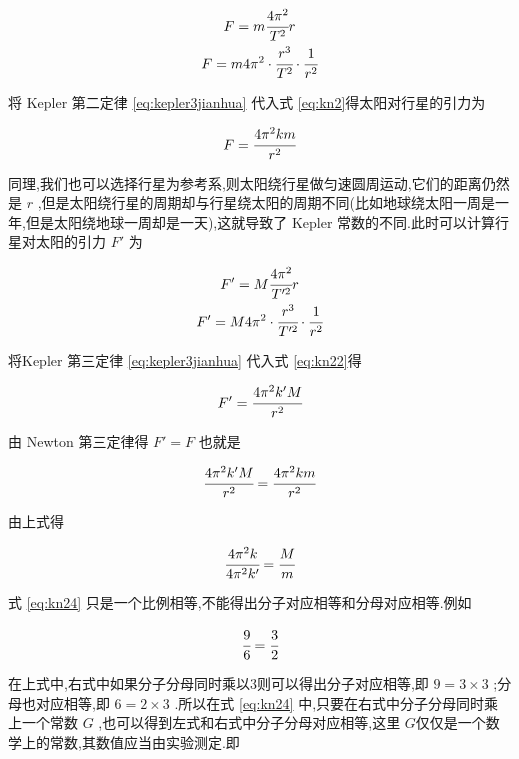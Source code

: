 \begin{gather}
  F=m\cfrac{4\pi^2}{T^2}r \notag\\
  F=m4\pi^2 \cdot \cfrac{r^3}{T^2} \cdot \cfrac{1}{r^2} 
  \label{eq:kn2}
\end{gather}

将 Kepler 第二定律 \eqref{eq:kepler3jianhua} 代入式 \eqref{eq:kn2}得太阳对行星的引力为

\begin{equation}
  F=\cfrac{4\pi^2km}{r^2}
  \label{eq:kn21}
\end{equation}

同理,我们也可以选择行星为参考系,则太阳绕行星做匀速圆周运动,它们的距离仍然是 $r$ ,但是太阳绕行星的周期却与行星绕太阳的周期不同(比如地球绕太阳一周是一年,但是太阳绕地球一周却是一天),这就导致了 Kepler 常数的不同.此时可以计算行星对太阳的引力 $F'$  为

\begin{gather}
  F'=M\cfrac{4\pi^2}{T'^2}r \notag \\
  F'=M4\pi^2 \cdot \cfrac{r^3}{T'^2} \cdot \cfrac{1}{r^2}
  \label{eq:kn22}
\end{gather}

将Kepler 第三定律 \eqref{eq:kepler3jianhua} 代入式 \eqref{eq:kn22}得


\begin{equation}
  F'=\cfrac{4\pi^2k'M}{r^2}
  \label{eq:kn23}
\end{equation}

由 Newton 第三定律得 $F'=F$ 也就是

\begin{equation*}
  \cfrac{4\pi^2k'M}{r^2}=\cfrac{4\pi^2km}{r^2}
\end{equation*}

由上式得

\begin{equation}
  \cfrac{4\pi^2k}{4\pi^2k'}=\cfrac{M}{m}
  \label{eq:kn24}
\end{equation}

式 \eqref{eq:kn24} 只是一个比例相等,不能得出分子对应相等和分母对应相等.例如

\begin{equation*}
  \cfrac{9}{6}=\cfrac{3}{2}
\end{equation*}

在上式中,右式中如果分子分母同时乘以$3$则可以得出分子对应相等,即 $9=3\times 3$ ;分母也对应相等,即 $6=2\times 3$ .所以在式 \eqref{eq:kn24} 中,只要在右式中分子分母同时乘上一个常数 $G$ ,也可以得到左式和右式中分子分母对应相等,这里 $G$仅仅是一个数学上的常数,其数值应当由实验测定.即


